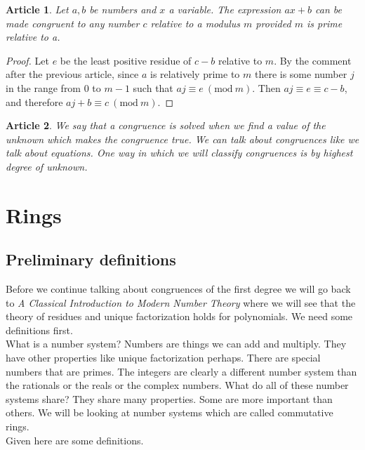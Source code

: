\documentclass{article}
\theoremstyle{problemstyle}
\newtheorem{article}{Article}
\newcommand{\Mod}[1]{\ (\mathrm{mod}\ #1)}
\begin{document}
\begin{article}
Let $a,b$ be numbers and $x$ a variable. The expression $ax + b$ can be made congruent to any number $c$ relative to a modulus $m$ provided $m$ is prime relative to a. 
\end{article}

\begin{proof}
Let $e$ be the least positive residue of $c-b$ relative to $m$. By the comment after the previous article, since $a$ is relatively prime to $m$ there is some number $j$ in the range from $0$ to $m-1$ such that $aj \equiv e \Mod{m}$. Then $aj \equiv e \equiv c-b$, and therefore $aj + b \equiv c \Mod{m}$. 
\end{proof}

\begin{article}
We say that a congruence is solved when we find a value of the unknown which makes the congruence true. We can talk about congruences like we talk about equations. One way in which we will classify congruences is by highest degree of unknown. 
\end{article}

\section*{Rings}

\subsection*{Preliminary definitions}

Before we continue talking about congruences of the first degree we will go back to \textit{A Classical Introduction to Modern Number Theory} where we will see that the theory of residues and unique factorization holds for polynomials. We need some definitions first.\\

What is a number system? Numbers are things we can add and multiply. They have other properties like unique factorization perhaps. There are special numbers that are primes. The integers are clearly a different number system than the rationals or the reals or the complex numbers. What do all of these number systems share? They share many properties. Some are more important than others. We will be looking at number systems which are called commutative rings.\\

Given here are some definitions. 

\setcounter{definition}{0}
\end{document}
